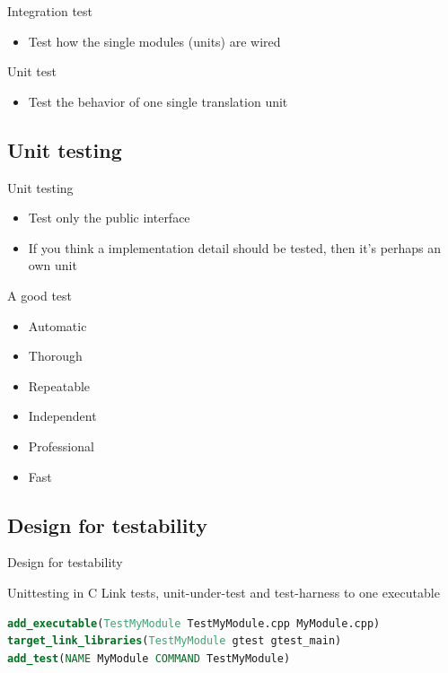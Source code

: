 \documentclass{beamer}
\begin{document}
\begin{frame}{Integration test}
\begin{itemize}
  \item Test how the single modules (units) are wired
\end{itemize}
\end{frame}

\begin{frame}{Unit test}
\begin{itemize}
  \item Test the behavior of one single translation unit
\end{itemize}
\end{frame}

\subsection{Unit testing}
\begin{frame}{Unit testing}
\begin{itemize}
  \item Test only the public interface
  \item If you think a implementation detail should be tested, then it's perhaps
  an own unit
\end{itemize}
\end{frame}

\begin{frame}{A good test}
\begin{itemize}
  \item Automatic
  \item Thorough
  \item Repeatable
  \item Independent
  \item Professional
  \item Fast
\end{itemize}
\end{frame}

\subsection{Design for testability}
\begin{frame}{Design for testability}
\end{frame}

\begin{frame}[fragile]{Unittesting in C}
Link tests, unit-under-test and test-harness to one executable
\begin{lstlisting}[language=cmake,caption=a unit test in cmake]
add_executable(TestMyModule TestMyModule.cpp MyModule.cpp)
target_link_libraries(TestMyModule gtest gtest_main)
add_test(NAME MyModule COMMAND TestMyModule)
\end{lstlisting}
\end{frame}
\end{document}
